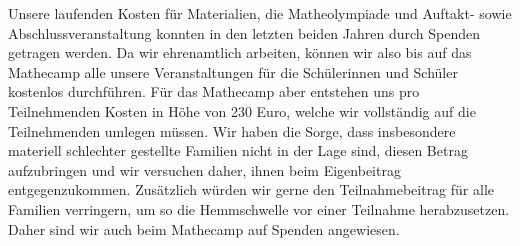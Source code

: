 \documentclass{zirkelbrief}
\begin{document}
% 
% 



Unsere laufenden Kosten für Materialien, die Matheolympiade und Auftakt- sowie Abschlussveranstaltung konnten in den letzten beiden Jahren durch Spenden getragen werden. Da wir ehrenamtlich arbeiten, können wir also bis auf das Mathecamp alle unsere Veranstaltungen für die Schülerinnen und Schüler kostenlos durchführen. Für das Mathecamp aber entstehen uns pro Teilnehmenden Kosten in Höhe von 230 Euro, welche wir vollständig auf die Teilnehmenden umlegen müssen. Wir haben die Sorge, dass insbesondere materiell schlechter gestellte Familien nicht in der Lage sind, diesen Betrag aufzubringen und wir versuchen daher, ihnen beim Eigenbeitrag entgegenzukommen. Zusätzlich würden wir gerne den Teilnahmebeitrag für alle Familien verringern, um so die Hemmschwelle vor einer Teilnahme herabzusetzen. Daher sind wir auch beim Mathecamp auf Spenden angewiesen.

\end{document}
